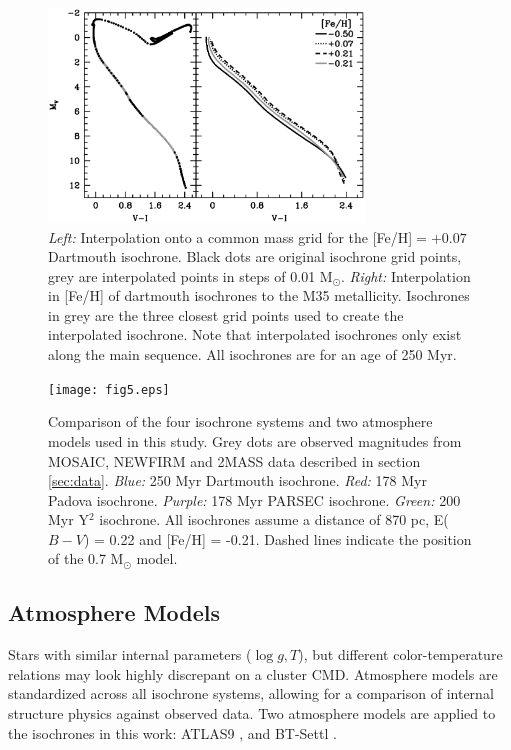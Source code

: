 \documentclass[iop]{emulateapj}
\begin{document}
\begin{figure} \centering
\includegraphics[trim = 0mm 62mm 5mm 5mm, clip, width=3.3in]{fig4.eps}		%
\caption{\emph{Left:} Interpolation onto a common mass grid for the [Fe/H]$=+0.07$ Dartmouth isochrone. Black dots are original isochrone grid points, grey are interpolated points in steps of 0.01 M$_\odot$. \emph{Right:} Interpolation in [Fe/H] of dartmouth isochrones to the M35 metallicity. Isochrones in grey are the three closest grid points used to create the interpolated isochrone. Note that interpolated isochrones only exist along the main sequence. All isochrones are for an age of 250 Myr.\label{fig:isointerp}}
\end{figure}

\begin{figure} \centering
\texttt{[image: fig5.eps]}		%
\caption{Comparison of the four isochrone systems and two atmosphere models used in this study. Grey dots are observed magnitudes from MOSAIC, NEWFIRM and 2MASS data described in section \ref{sec:data}. \emph{Blue:} 250 Myr Dartmouth isochrone. \emph{Red:} 178 Myr Padova isochrone. \emph{Purple:} 178 Myr PARSEC isochrone. \emph{Green:} 200 Myr Y$^2$ isochrone. All isochrones assume a distance of 870 pc, E($B-V$) = 0.22 and [Fe/H] = -0.21. Dashed lines indicate the position of the 0.7 M$_\odot$ model. \label{fig:isocompare}}
\end{figure}

\subsection{Atmosphere Models}
Stars with similar internal parameters ($\log g, T$), but different color-temperature relations may look highly discrepant on a cluster CMD. Atmosphere models are standardized across all isochrone systems, allowing for a comparison of internal structure physics against observed data. Two atmosphere models are applied to the isochrones in this work: ATLAS9 \citep{2003IAUS..210P.A20C}, and BT-Settl \citep{2012RSPTA.370.2765A}.
\end{document}
